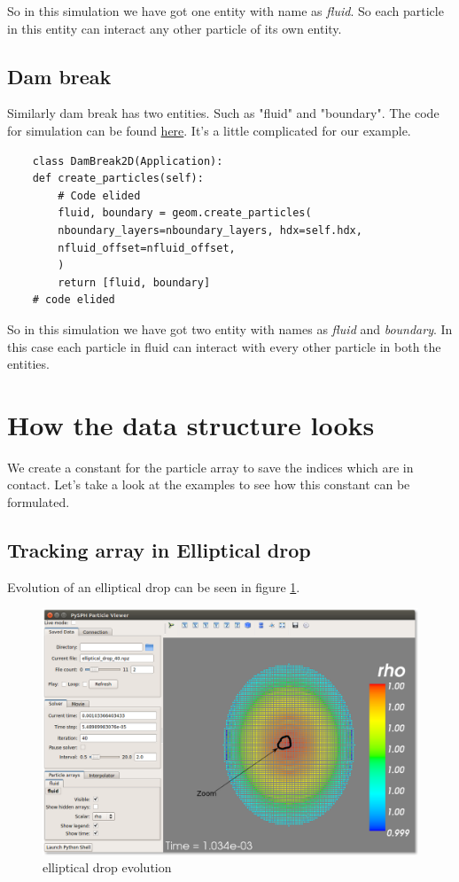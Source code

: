 \documentclass[11pt]{article}
\begin{document}
So in this simulation we have got one entity with name as \emph{fluid}. So each particle
in this entity can interact any other particle of its own entity.

\subsection{Dam break}
\label{sec:org2fad3ed}
Similarly dam break has two entities. Such as "fluid" and "boundary". The
code for simulation can be found \href{https://github.com/pypr/pysph/blob/master/pysph/examples/dam\_break\_2d.py}{here}. It's a little complicated for our
example.


\begin{verbatim}
    class DamBreak2D(Application):
	def create_particles(self):
	    # Code elided
	    fluid, boundary = geom.create_particles(
		nboundary_layers=nboundary_layers, hdx=self.hdx,
		nfluid_offset=nfluid_offset,
	    )
	    return [fluid, boundary]
	# code elided
\end{verbatim}

So in this simulation we have got two entity with names as \emph{fluid} and
\emph{boundary}. In this case each particle in fluid can interact with every other
particle in both the entities.


\section{How the data structure looks}
\label{sec:orgb8b4bb0}
We create a constant for the particle array to save the indices which are in
contact. Let's take a look at the examples to see how this constant can be
formulated.

\subsection{Tracking array in Elliptical drop}
\label{sec:orga151af0}
Evolution of an elliptical drop can be seen in figure \ref{fig:el_d}.
\begin{figure}[H]
\centering
\includegraphics[scale=0.35]{dem_pysph_implementation_figures/elliptical_drop.png}
\caption{elliptical drop evolution\label{fig:el_d}}
\end{figure}
\end{document}
